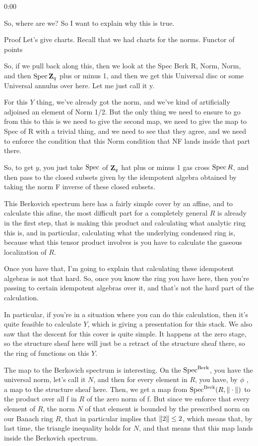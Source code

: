 \begin{unfinished}{0:00}
{So, where are we?
So I want to explain why this is true. 

Proof
Let's give charts.
Recall that we had charts for the norms.
Functor of points

So, if we pull back along this, then we look at the Spec Berk R, Norm, Norm, and then $\operatorname{Spec} \mathbf Z_q$ plus or minus 1, and then we get this Universal disc or some Universal annulus over here. Let me just call it y.

For this $Y$ thing, we've already got the norm, and we've kind of artificially adjoined an element of Norm 1/2. But the only thing we need to ensure to go from this to this is we need to give the second map, we need to give the map to Spec of R with a trivial thing, and we need to see that they agree, and we need to enforce the condition that this Norm condition that NF lands inside that part there.

So, to get $y$, you just take $\operatorname{Spec}$ of $\mathbf Z_q$ hat plus or minus 1 gas cross $\operatorname{Spec} R$, and then pass to the closed subsets given by the idempotent algebra obtained by taking the norm F inverse of these closed subsets.

This Berkovich spectrum here has a fairly simple cover by an affine, and to calculate this afine, the most difficult part for a completely general $R$ is already in the first step, that is making this product and calculating what analytic ring this is, and in particular, calculating what the underlying condensed ring is, because what this tensor product involves is you have to calculate the gaseous localization of $R$.

Once you have that, I'm going to explain that calculating these idempotent algebras is not that hard. So, once you know the ring you have here, then you're passing to certain idempotent algebras over it, and that's not the hard part of the calculation.

In particular, if you're in a situation where you can do this calculation, then it's quite feasible to calculate $Y$, which is giving a presentation for this stack. We also saw that the descent for this cover is quite simple. It happens at the zero stage, so the structure sheaf here will just be a retract of the structure sheaf there, so the ring of functions on this $Y$.


The map to the Berkovich spectrum is interesting. On the $\operatorname{Spec}^{\mathrm{Berk}}$, you have the universal norm, let's call it $N$, and then for every element in $R$, you have, by $\phi$ , a map to the structure sheaf here. Then, we get a map from $\operatorname{Spec}^{\mathrm{Berk}} (R, \| \cdot \| )$ to the product over all f in $R$ of the zero norm of f.
But since we enforce that every element of $R$, the norm $N$ of that element is bounded by the prescribed norm on our Banach ring $R$, that in particular implies that $\| 2 \| \leq 2$, which means that, by last time, the triangle inequality holds for $N$, and that means that this map lands inside the Berkovich spectrum.

}
\end{unfinished}
